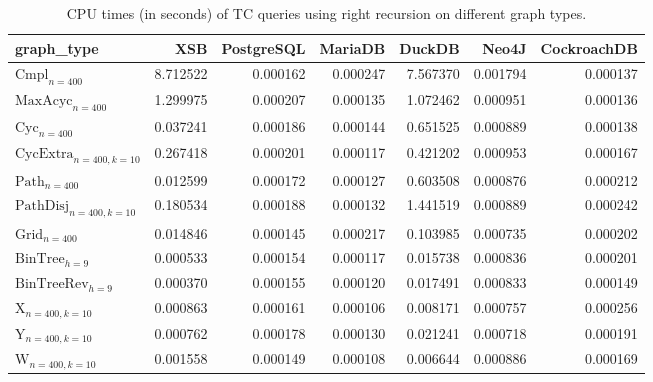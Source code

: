 \begin{table}
\caption{CPU times (in seconds) of TC queries using right recursion on different graph types.}
\label{table:right_recursion_cpu_time}
\begin{tabular}{lrrrrrr}
\toprule
graph\_type & XSB & PostgreSQL & MariaDB & DuckDB & Neo4J & CockroachDB \\
\midrule
$\text{Cmpl}_{n=400}$ & 8.712522 & 0.000162 & 0.000247 & 7.567370 & 0.001794 & 0.000137 \\
$\text{MaxAcyc}_{n=400}$ & 1.299975 & 0.000207 & 0.000135 & 1.072462 & 0.000951 & 0.000136 \\
$\text{Cyc}_{n=400}$ & 0.037241 & 0.000186 & 0.000144 & 0.651525 & 0.000889 & 0.000138 \\
$\text{CycExtra}_{n=400,k=10}$ & 0.267418 & 0.000201 & 0.000117 & 0.421202 & 0.000953 & 0.000167 \\
$\text{Path}_{n=400}$ & 0.012599 & 0.000172 & 0.000127 & 0.603508 & 0.000876 & 0.000212 \\
$\text{PathDisj}_{n=400,k=10}$ & 0.180534 & 0.000188 & 0.000132 & 1.441519 & 0.000889 & 0.000242 \\
$\text{Grid}_{n=400}$ & 0.014846 & 0.000145 & 0.000217 & 0.103985 & 0.000735 & 0.000202 \\
$\text{BinTree}_{h=9}$ & 0.000533 & 0.000154 & 0.000117 & 0.015738 & 0.000836 & 0.000201 \\
$\text{BinTreeRev}_{h=9}$ & 0.000370 & 0.000155 & 0.000120 & 0.017491 & 0.000833 & 0.000149 \\
$\text{X}_{n=400, k=10}$ & 0.000863 & 0.000161 & 0.000106 & 0.008171 & 0.000757 & 0.000256 \\
$\text{Y}_{n=400,k=10}$ & 0.000762 & 0.000178 & 0.000130 & 0.021241 & 0.000718 & 0.000191 \\
$\text{W}_{n=400,k=10}$ & 0.001558 & 0.000149 & 0.000108 & 0.006644 & 0.000886 & 0.000169 \\
\bottomrule
\end{tabular}
\end{table}
